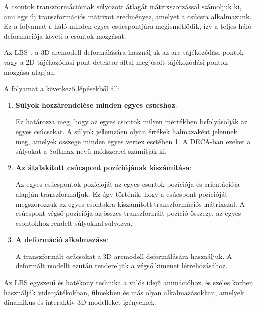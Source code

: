 \documentclass[12pt,a4]{article}
\begin{document}
                A csontok transzformációinak súlyozott átlagát mátrixszorzással számoljuk ki, ami egy új transzformációs mátrixot eredményez, amelyet a csúcsra alkalmazunk. Ez a folyamat a háló minden egyes csúcspontjára megismétlődik, így a teljes háló deformációja követi a csontok mozgását.
                
                Az LBS-t a 3D arcmodell deformálására használjuk az arc tájékozódási pontok vagy a 2D tájékozódási pont detektor által megjósolt tájékozódási pontok mozgása alapján.

                A folyamat a következő lépésekből áll:
                    \begin{enumerate}
                        \item \textbf{Súlyok hozzárendelése minden egyes csúcshoz}: 
                        
                        Ez határozza meg, hogy az egyes csontok milyen mértékben befolyásolják az egyes csúcsokat. 
                    	A súlyok jellemzően olyan értékek halmazaként jelennek meg, amelyek összege minden egyes vertex esetében 1. A DECA-ban ezeket a súlyokat a Softmax nevű módszerrel számítják ki.
                    
                        \item \textbf{Az átalakított csúcspont pozíciójának kiszámítása}: 
                        
                        Az egyes csúcspontok pozícióját az egyes csontok pozíciója és orientációja alapján transzformáljuk. 
                    	Ez úgy történik, hogy a csúcspont pozícióját megszorozzuk az egyes csontokra kiszámított transzformációs mátrixszal. 
                    	A csúcspont végső pozíciója az összes transzformált pozíció összege, az egyes csontokhoz rendelt súlyokkal súlyozva.
                    
                        \item \textbf{A deformáció alkalmazása}: 
                        
                        A transzformált csúcsokat a 3D arcmodell deformálására használjuk. A deformált modellt ezután rendereljük a végső kimenet létrehozásához.
                    \end{enumerate}

                Az LBS egyszerű és hatékony technika a valós idejű animációhoz, és széles körben használják videojátékokban, filmekben és más olyan alkalmazásokban, amelyek dinamikus és interaktív 3D modelleket igényelnek.
\end{document}
